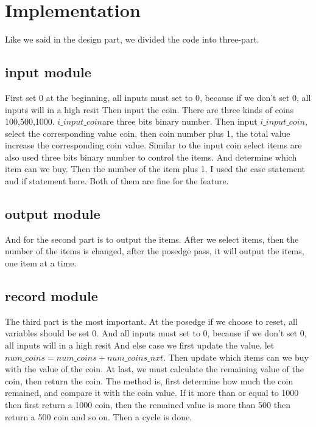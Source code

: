 \documentclass[12pt,a4paper]{article}
\begin{document}


\newpage

\section{Implementation}

Like we said in the design part, we divided the code into three-part.

\subsection{input module}

First set 0 at the beginning, all inputs must set to 0, because if we don't set 0, all inputs will in a high resit
Then input the coin. There are three kinds of coins 100,500,1000.
$i\_input\_coin $are three bits binary number. 
Then input $i\_input\_coin$, select the corresponding value coin, then coin number plus 1, the total value increase the corresponding coin value.
Similar to the input coin select items are also used three bits binary number to control the items. 
And determine which item can we buy.
Then the number of the item plus 1.
I used the case statement and if statement here.
Both of them are fine for the feature.

\subsection{output module}

And for the second part is to output the items. 
After we select items, then the number of the items is changed, after the posedge pass, it will output the items, one item at a time.

\subsection{record module}

The third part is the most important.
At the posedge if we choose to reset, all variables should be set 0.
And all inputs must set to 0, because if we don't set 0, all inputs will in a high resit
And else case we first update the value, let $num\_coins =num\_coins + num\_coins\_nxt$.
Then update which items can we buy with the value of the coin.
At last, we must calculate the remaining value of the coin, then return the coin.
The method is, first determine how much the coin remained, and compare it with the coin value.
If it more than or equal to 1000 then first return a 1000 coin, then the remained value is more than 500 then return a 500 coin and so on.
Then a cycle is done.  
\end{document}

